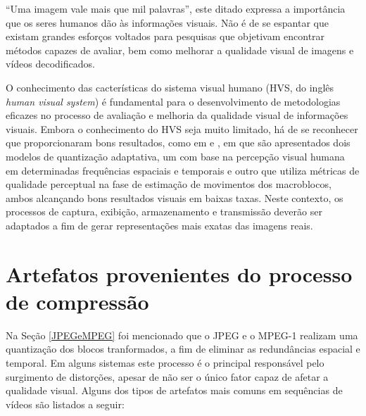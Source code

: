 
\thispagestyle{fancy}

``Uma imagem vale mais que mil palavras'', este ditado expressa a importância que os seres humanos dão às informações visuais. Não é de se espantar que existam grandes esforços voltados para pesquisas que objetivam encontrar métodos capazes de avaliar, bem como melhorar a qualidade visual de imagens e vídeos decodificados.

O conhecimento das cacterísticas do sistema visual humano (HVS, do inglês \textit{human visual system}) é fundamental para o desenvolvimento de metodologias eficazes no processo de avaliação e melhoria da qualidade visual de informações visuais. Embora o conhecimento do HVS seja muito limitado, há de se reconhecer que proporcionaram bons resultados, como em \cite{Li_humanvisual} e \cite{5941158}, em que são apresentados dois modelos de quantização adaptativa, um com base na percepção visual humana em determinadas frequências espaciais e temporais e outro que utiliza métricas de qualidade perceptual na fase de estimação de movimentos dos macroblocos, ambos alcançando bons resultados visuais em baixas taxas. Neste contexto, os processos de captura, exibição, armazenamento e transmissão deverão ser adaptados a fim de gerar representações mais exatas das imagens reais.


\section{Artefatos provenientes do processo de compressão}
\label{artefatos}

Na Seção \ref{JPEGeMPEG} foi mencionado que o JPEG e o MPEG-1 realizam uma quantização dos blocos tranformados, a fim de eliminar as redundâncias espacial e temporal. Em alguns sistemas este processo é o principal responsável pelo surgimento de distorções, apesar de não ser o único fator capaz de afetar a qualidade visual. Alguns dos tipos de artefatos mais comuns em sequências de vídeos são listados a seguir:

